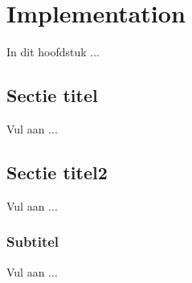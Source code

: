 \chapter{Implementation}

In dit hoofdstuk ...

\section{Sectie titel}

Vul aan ...

\section{Sectie titel2}

Vul aan ...

\subsection{Subtitel}
Vul aan ...